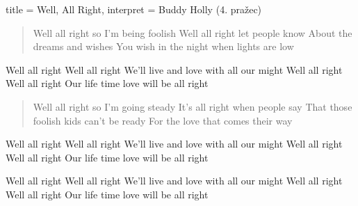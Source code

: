 \begin{song}
{
title = {Well, All Right},
interpret = {Buddy Holly}
}
(4. pražec)
\begin{verse}
Well all right so I'm being foolish
Well all right let people know
About the dreams and wishes
You wish in the night when lights are low
\end{verse}

\begin{chorus}
Well all right Well all right
We'll live and love with all our might
Well all right Well all right
Our life time love will be all right
\end{chorus}

\begin{verse}
Well all right so I'm going steady
It's all right when people say
That those foolish kids can't be ready
For the love that comes their way
\end{verse}

\begin{chorus}
Well all right Well all right
We'll live and love with all our might
Well all right Well all right
Our life time love will be all right
\end{chorus}

\begin{chorus}
Well all right Well all right
We'll live and love with all our might
Well all right Well all right
Our life time love will be all right
\end{chorus}

\end{song}